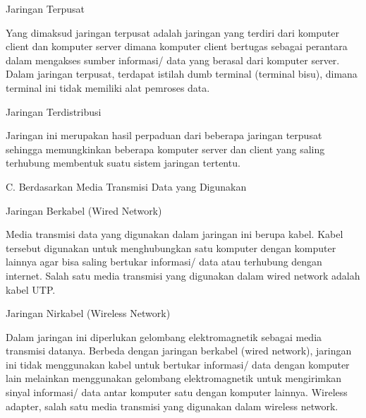 \documentclass[a4paper,12pt]{report}
\begin{document}
\vspace{12pt}
\noindent 
\begin{myEnumerate}
\item Jaringan Terpusat \par
Yang dimaksud jaringan terpusat adalah jaringan yang terdiri dari komputer client dan komputer server dimana komputer client bertugas sebagai perantara dalam mengakses sumber informasi/ data yang berasal dari komputer server. Dalam jaringan terpusat, terdapat istilah dumb terminal (terminal bisu), dimana terminal ini tidak memiliki alat pemroses data. \par
\vspace{12pt}
\noindent 
\item Jaringan Terdistribusi\end{myEnumerate}
 \par
Jaringan ini merupakan hasil perpaduan dari beberapa jaringan terpusat sehingga memungkinkan beberapa komputer server dan client yang saling terhubung membentuk suatu sistem jaringan tertentu. \par
\vspace{12pt}
\vspace{12pt}
\vspace{12pt}
\vspace{12pt}
\noindent 
C. Berdasarkan Media Transmisi Data yang Digunakan \par
\noindent 
\begin{myEnumerate}
\item Jaringan Berkabel (Wired Network) \par
Media transmisi data yang digunakan dalam jaringan ini berupa kabel. Kabel tersebut digunakan untuk menghubungkan satu komputer dengan komputer lainnya agar bisa saling bertukar informasi/ data atau terhubung dengan internet. Salah satu media transmisi yang digunakan dalam wired network adalah kabel UTP. \par
\vspace{12pt}
\noindent 
\item Jaringan Nirkabel (Wireless Network)\end{myEnumerate}
 \par
Dalam jaringan ini diperlukan gelombang elektromagnetik sebagai media transmisi datanya. Berbeda dengan jaringan berkabel (wired network), jaringan ini tidak menggunakan kabel untuk bertukar informasi/ data dengan komputer lain melainkan menggunakan gelombang elektromagnetik untuk mengirimkan sinyal informasi/ data antar komputer satu dengan komputer lainnya. Wireless adapter, salah satu media transmisi yang digunakan dalam wireless network. \par
\end{document}
